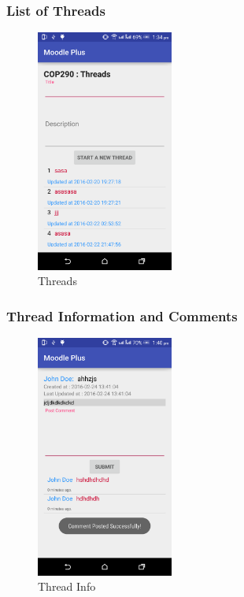 \documentclass[12pt]{article}
\begin{document}
\subsubsection{List of Threads}
\begin{figure}[!ht]
	\centering
	\includegraphics[width=0.4\textwidth]{images/threads.png}
	\caption{Threads}
\end{figure}
\FloatBarrier

\subsubsection{Thread Information and Comments}
\begin{figure}[!ht]
	\centering
	\includegraphics[width=0.4\textwidth]{images/comments.png}
	\caption{Thread Info}
\end{figure}
\FloatBarrier
\end{document}
